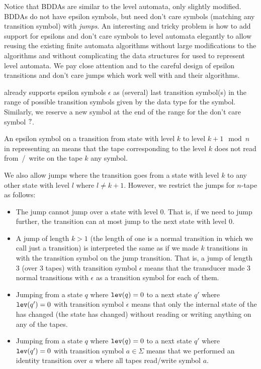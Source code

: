 Notice that BDDAs are similar to the level automata, only slightly modified.
BDDAs do not have epsilon symbols, but need don't care symbols (matching any transition symbol) with \emph{jumps}.
An interesting and tricky problem is how to add support for epsilons and don't care symbols to level automata elegantly to allow reusing the existing finite automata algorithms without large modifications to the algorithms and without complicating the data structures for \nfas used to represent level automata.
We pay close attention and to the careful design of epsilon transitions and don't care jumps which work well with \nfas and their algorithms.

\mata already supports epsilon symbols $\epsilon$ as (several) last transition symbol(s) in the range of possible transition symbols given by the data type for the symbol.
Similarly, we reserve a new symbol at the end of the range for the don't care symbol $?$.

An epsilon symbol on a transition from state with level $k$ to level $k + 1 \mod n$ in \nfaClass representing an \nft means that the tape corresponding to the level $k$ does not read from~/~write on the tape $k$ any symbol.

We also allow jumps where the transition goes from a state with level $k$ to any other state with level $l$ where $l \neq k + 1$.
However, we restrict the jumps for $n$-tape \nft as follows:
\begin{itemize}
  \item The jump cannot jump over a state with level $0$.
  That is, if we need to jump further, the transition can at most jump to the next state with level $0$.
  \item A jump of length $k > 1$ (the length of one is a normal transition in \nfaClass which we call just a transition) is interpreted the same as if we made $k$ transitions in \nfaClass with the transition symbol on the jump transition.
  That is, a jump of length $3$ (over $3$ tapes) with transition symbol $\epsilon$ means that the transducer made $3$ normal transitions with $\epsilon$ as a transition symbol for each of them.
  \item Jumping from a state $q$ where $\texttt{lev}(q) = 0$ to a next state $q'$ where $\texttt{lev}(q') = 0$ with transition symbol $\epsilon$ means that only the internal state of the \nft has changed (the state has changed) without reading or writing anything on any of the tapes.
  \item Jumping from a state $q$ where $\texttt{lev}(q) = 0$ to a next state $q'$ where $\texttt{lev}(q') = 0$ with transition symbol $a \in \Sigma$ means that we performed an identity \nft transition over $a$ where all tapes read/write symbol $a$.
\end{itemize}


